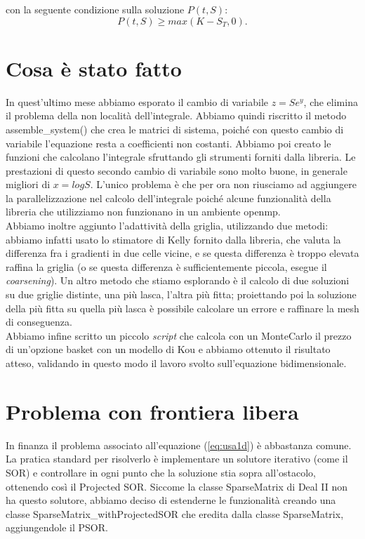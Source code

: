 \documentclass[a4paper,10pt]{article}
\begin{document}
con la seguente condizione sulla soluzione $P(t,S)$: $$P(t,S)\geq max(K-S_T, 0).$$

\section{Cosa \`e stato fatto}
In quest'ultimo mese abbiamo esporato il cambio di variabile $z=Se^y$, che elimina il problema della non localit\`a dell'integrale. Abbiamo quindi riscritto il metodo \textsf{assemble\_system()} che crea le matrici di sistema, poich\'e con questo cambio di variabile l'equazione resta a coefficienti non costanti. Abbiamo poi creato le funzioni che calcolano l'integrale sfruttando gli strumenti forniti dalla libreria. Le prestazioni di questo secondo cambio di variabile sono molto buone, in generale migliori di $x=logS$. L'unico problema \`e che per ora non riusciamo ad aggiungere la parallelizzazione nel calcolo dell'integrale poich\'e alcune funzionalit\`a della libreria che utilizziamo non funzionano in un ambiente \textsf{openmp}.\\Abbiamo inoltre aggiunto l'adattivit\`a della griglia, utilizzando due metodi: abbiamo infatti usato lo stimatore di Kelly fornito dalla libreria, che valuta la differenza fra i gradienti in due celle vicine, e se questa differenza \`e troppo elevata raffina la griglia (o se questa differenza \`e sufficientemente piccola, esegue il \emph{coarsening}). Un altro metodo che stiamo esplorando \`e il calcolo di due soluzioni su due griglie distinte, una pi\`u lasca, l'altra pi\`u fitta; proiettando poi la soluzione della pi\`u fitta su quella pi\`u lasca \`e possibile calcolare un errore e raffinare la mesh di conseguenza.\\Abbiamo infine scritto un piccolo \emph{script} che calcola con un MonteCarlo il prezzo di un'opzione basket con un modello di Kou e abbiamo ottenuto il risultato atteso, validando in questo modo il lavoro svolto sull'equazione bidimensionale.

\section{Problema con frontiera libera}
In finanza il problema associato all'equazione (\ref{eq:usa1d}) \`e abbastanza comune. La pratica standard per risolverlo \`e implementare un solutore iterativo (come il SOR) e controllare in ogni punto che la soluzione stia sopra all'ostacolo, ottenendo cos\`i il Projected SOR. Siccome la classe \textsf{SparseMatrix} di Deal II non ha questo solutore, abbiamo deciso di estenderne le funzionalit\`a creando una classe \textsf{SparseMatrix\_withProjectedSOR} che eredita dalla classe \textsf{SparseMatrix}, aggiungendole il PSOR.
\end{document}
